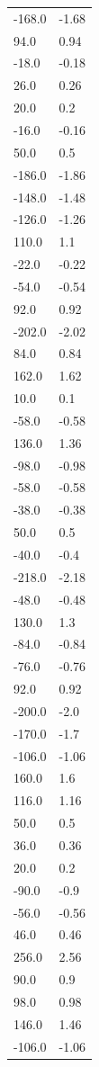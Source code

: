 \begin{longtable}{ll}
-168.0 & -1.68 \\
94.0 & 0.94 \\
-18.0 & -0.18 \\
26.0 & 0.26 \\
20.0 & 0.2 \\
-16.0 & -0.16 \\
50.0 & 0.5 \\
-186.0 & -1.86 \\
-148.0 & -1.48 \\
-126.0 & -1.26 \\
110.0 & 1.1 \\
-22.0 & -0.22 \\
-54.0 & -0.54 \\
92.0 & 0.92 \\
-202.0 & -2.02 \\
84.0 & 0.84 \\
162.0 & 1.62 \\
10.0 & 0.1 \\
-58.0 & -0.58 \\
136.0 & 1.36 \\
-98.0 & -0.98 \\
-58.0 & -0.58 \\
-38.0 & -0.38 \\
50.0 & 0.5 \\
-40.0 & -0.4 \\
-218.0 & -2.18 \\
-48.0 & -0.48 \\
130.0 & 1.3 \\
-84.0 & -0.84 \\
-76.0 & -0.76 \\
92.0 & 0.92 \\
-200.0 & -2.0 \\
-170.0 & -1.7 \\
-106.0 & -1.06 \\
160.0 & 1.6 \\
116.0 & 1.16 \\
50.0 & 0.5 \\
36.0 & 0.36 \\
20.0 & 0.2 \\
-90.0 & -0.9 \\
-56.0 & -0.56 \\
46.0 & 0.46 \\
256.0 & 2.56 \\
90.0 & 0.9 \\
98.0 & 0.98 \\
146.0 & 1.46 \\
-106.0 & -1.06 \\

\end{longtable}

